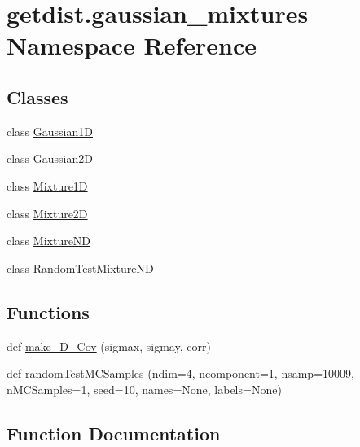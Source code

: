 \hypertarget{namespacegetdist_1_1gaussian__mixtures}{}\section{getdist.\+gaussian\+\_\+mixtures Namespace Reference}
\label{namespacegetdist_1_1gaussian__mixtures}
\subsection*{Classes}
\begin{DoxyCompactItemize}
\item 
class \mbox{\hyperlink{classgetdist_1_1gaussian__mixtures_1_1Gaussian1D}{Gaussian1D}}
\item 
class \mbox{\hyperlink{classgetdist_1_1gaussian__mixtures_1_1Gaussian2D}{Gaussian2D}}
\item 
class \mbox{\hyperlink{classgetdist_1_1gaussian__mixtures_1_1Mixture1D}{Mixture1D}}
\item 
class \mbox{\hyperlink{classgetdist_1_1gaussian__mixtures_1_1Mixture2D}{Mixture2D}}
\item 
class \mbox{\hyperlink{classgetdist_1_1gaussian__mixtures_1_1MixtureND}{Mixture\+ND}}
\item 
class \mbox{\hyperlink{classgetdist_1_1gaussian__mixtures_1_1RandomTestMixtureND}{Random\+Test\+Mixture\+ND}}
\end{DoxyCompactItemize}
\subsection*{Functions}
\begin{DoxyCompactItemize}
\item 
def \mbox{\hyperlink{namespacegetdist_1_1gaussian__mixtures_a5900e1fb93fe2c52203e3b305d1a7930}{make\+\_\+D\+\_\+\+Cov}} (sigmax, sigmay, corr)
\item 
def \mbox{\hyperlink{namespacegetdist_1_1gaussian__mixtures_a2c63cc2530d6da6e526b152add9a6a69}{random\+Test\+M\+C\+Samples}} (ndim=4, ncomponent=1, nsamp=10009, n\+M\+C\+Samples=1, seed=10, names=None, labels=None)
\end{DoxyCompactItemize}


\subsection{Function Documentation}
\mbox{\label{namespacegetdist_1_1gaussian__mixtures_a5900e1fb93fe2c52203e3b305d1a7930}} 
